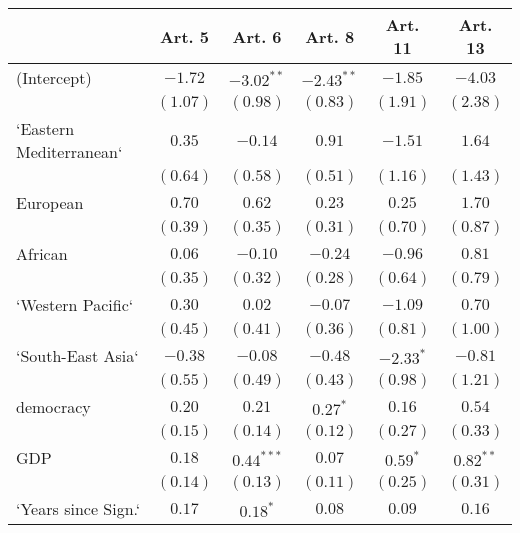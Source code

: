 
\begin{table}[!h]
\begin{center}
\begin{tabular}{l c c c c c }
\toprule
 & Art. 5 & Art. 6 & Art. 8 & Art. 11 & Art. 13 \\
\midrule
(Intercept)             & $-1.72$      & $-3.02^{**}$ & $-2.43^{**}$ & $-1.85$      & $-4.03$      \\
                        & $(1.07)$     & $(0.98)$     & $(0.83)$     & $(1.91)$     & $(2.38)$     \\
`Eastern Mediterranean` & $0.35$       & $-0.14$      & $0.91$       & $-1.51$      & $1.64$       \\
                        & $(0.64)$     & $(0.58)$     & $(0.51)$     & $(1.16)$     & $(1.43)$     \\
European                & $0.70$       & $0.62$       & $0.23$       & $0.25$       & $1.70$       \\
                        & $(0.39)$     & $(0.35)$     & $(0.31)$     & $(0.70)$     & $(0.87)$     \\
African                 & $0.06$       & $-0.10$      & $-0.24$      & $-0.96$      & $0.81$       \\
                        & $(0.35)$     & $(0.32)$     & $(0.28)$     & $(0.64)$     & $(0.79)$     \\
`Western Pacific`       & $0.30$       & $0.02$       & $-0.07$      & $-1.09$      & $0.70$       \\
                        & $(0.45)$     & $(0.41)$     & $(0.36)$     & $(0.81)$     & $(1.00)$     \\
`South-East Asia`       & $-0.38$      & $-0.08$      & $-0.48$      & $-2.33^{*}$  & $-0.81$      \\
                        & $(0.55)$     & $(0.49)$     & $(0.43)$     & $(0.98)$     & $(1.21)$     \\
democracy               & $0.20$       & $0.21$       & $0.27^{*}$   & $0.16$       & $0.54$       \\
                        & $(0.15)$     & $(0.14)$     & $(0.12)$     & $(0.27)$     & $(0.33)$     \\
GDP                     & $0.18$       & $0.44^{***}$ & $0.07$       & $0.59^{*}$   & $0.82^{**}$  \\
                        & $(0.14)$     & $(0.13)$     & $(0.11)$     & $(0.25)$     & $(0.31)$     \\
`Years since Sign.`     & $0.17$       & $0.18^{*}$   & $0.08$       & $0.09$       & $0.16$       \\

\end{tabular}
\end{center}
\end{table}
